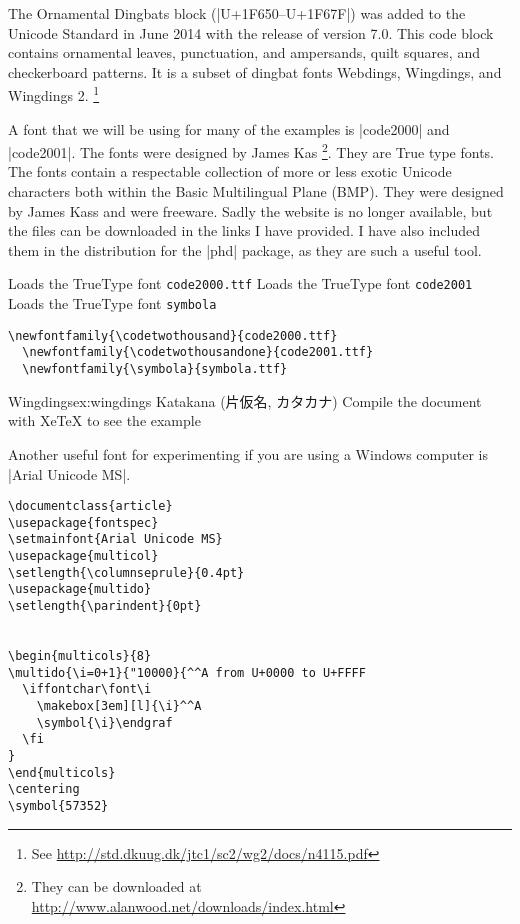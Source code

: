 The Ornamental Dingbats block (|U+1F650–U+1F67F|) was added to the Unicode Standard in June 2014 with the release of version 7.0. This code block contains ornamental leaves, punctuation, and ampersands, quilt squares, and checkerboard patterns. It is a subset of dingbat fonts Webdings, Wingdings, and Wingdings 2. \footnote{See \url{http://std.dkuug.dk/jtc1/sc2/wg2/docs/n4115.pdf}}

A font that we will be using for many of the \XeLaTeX examples is |code2000|
and |code2001|. The fonts were designed by James Kas
\footnote{They can be downloaded at \url{http://www.alanwood.net/downloads/index.html}}. They are True type fonts. The fonts contain a respectable collection of more or less exotic Unicode characters both within the Basic Multilingual Plane (BMP). They were designed by James Kass and were freeware. Sadly the website is no longer available, but the files can be downloaded in the links I have provided. I have also included them in the distribution for the |phd| package, as they are such a useful tool.


\CMDI{\codetwothousand} Loads the TrueType font \texttt{code2000.ttf}
\CMDI{\codetwothousandone} Loads the TrueType font \texttt{code2001}
\CMDI{\symbola} Loads the TrueType font \texttt{symbola}
\begin{verbatim}
\newfontfamily{\codetwothousand}{code2000.ttf}
  \newfontfamily{\codetwothousandone}{code2001.ttf}
  \newfontfamily{\symbola}{symbola.ttf}
\end{verbatim}



\begin{texexample}{Wingdings}{ex:wingdings}
\ifxetex
   {\codetwothousand {} 
    Katakana (片仮名, カタカナ)
   \codetwothousandone {}
   \symbola {}
  }
\else
   Compile the document with XeTeX to see the example
\fi
\end{texexample}

Another useful font for experimenting if you are using a Windows computer is |Arial Unicode MS|.

\begin{verbatim}
\documentclass{article}
\usepackage{fontspec}
\setmainfont{Arial Unicode MS}
\usepackage{multicol}
\setlength{\columnseprule}{0.4pt}
\usepackage{multido}
\setlength{\parindent}{0pt}


\begin{multicols}{8}
\multido{\i=0+1}{"10000}{^^A from U+0000 to U+FFFF
  \iffontchar\font\i
    \makebox[3em][l]{\i}^^A
    \symbol{\i}\endgraf
  \fi
}
\end{multicols}
\centering
\symbol{57352}

\end{verbatim} 

